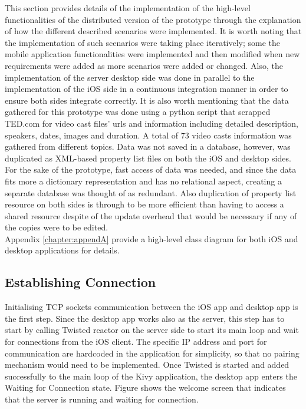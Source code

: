 This section provides details of the implementation of the high-level functionalities of the distributed version of the prototype through the explanation of how the different described scenarios were implemented. It is worth noting that the implementation of such scenarios were taking place iteratively; some the mobile application functionalities were implemented and then modified when new requirements were added as more scenarios were added or changed. Also, the implementation of the server desktop side was done in parallel to the implementation of the iOS side in a continuous integration manner in order to ensure both sides integrate correctly. It is also worth mentioning that the data gathered for this prototype was done using a python script that scrapped TED.com for video cast files' urls and information including detailed description, speakers, dates, images and duration. A total of 73 video casts information was gathered from different topics. Data was not saved in a database, however, was duplicated as XML-based property list files on both the iOS and desktop sides. For the sake of the prototype, fast access of data was needed, and since the data fits more a dictionary representation and has no relational aspect, creating a separate database was thought of as redundant. Also duplication of property list resource on both sides is through to be more efficient than having to access a shared resource despite of the update overhead that would be necessary if any of the copies were to be edited.\\
Appendix \ref{chapter:appendA} provide a high-level class diagram for both iOS and desktop applications for details.

\subsection{Establishing Connection}
Initialising TCP sockets communication between the iOS app and desktop app is the first step. Since the desktop app works also as the server, this step has to start by calling Twisted reactor on the server side to start its main loop and wait for connections from the iOS client. The specific IP address and port for communication are hardcoded in the application for simplicity, so that no pairing mechanism would need to be implemented. Once Twisted is started and added successfully to the main loop of the Kivy application, the desktop app enters the Waiting for Connection state. Figure shows the welcome screen that indicates that the server is running and waiting for connection.\\

